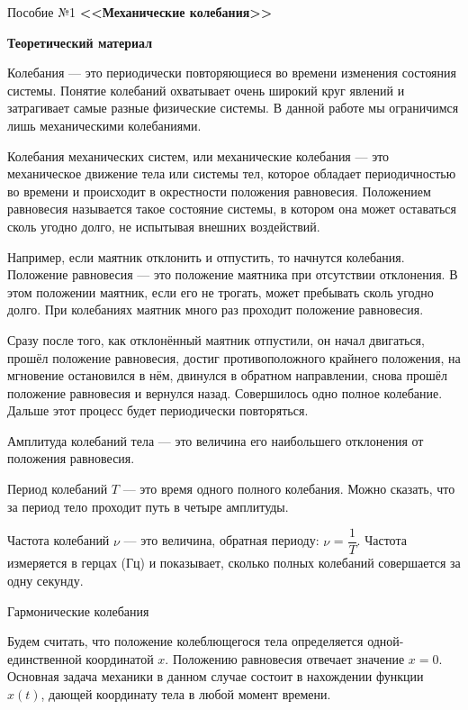 \documentclass[a4paper,12pt]{article} %
\date{}
\author{}
\begin{document}
Пособие №1
\hfill
{\bf <<Механические колебания>>}

\begin{center}
\large \bf Теоретический материал
\end{center}

Колебания — это периодически повторяющиеся во времени изменения состояния
системы. Понятие колебаний охватывает очень широкий круг явлений и затрагивает
самые разные физические системы. В данной работе мы ограничимся лишь
механическими колебаниями.

Колебания механических систем, или механические колебания — это механическое
движение тела или системы тел, которое обладает периодичностью во времени и
происходит в окрестности положения равновесия. Положением равновесия называется
такое состояние системы, в котором она может оставаться сколь угодно долго, не
испытывая внешних воздействий.

Например, если маятник отклонить и отпустить, то начнутся колебания.
Положение равновесия — это положение маятника при отсутствии отклонения. В этом
положении маятник, если его не трогать, может пребывать сколь угодно долго. При
колебаниях маятник много раз проходит положение равновесия.

Сразу после того, как отклонённый маятник отпустили, он начал двигаться, прошёл
положение равновесия, достиг противоположного крайнего положения, на мгновение
остановился в нём, двинулся в обратном направлении, снова прошёл положение
равновесия и вернулся назад. Совершилось одно полное колебание. Дальше этот
процесс будет периодически повторяться.

Амплитуда колебаний тела — это величина его наибольшего отклонения от
положения равновесия.

Период колебаний $T$ — это время одного полного колебания. Можно сказать, что за
период тело проходит путь в четыре амплитуды.

Частота колебаний $\nu$ — это величина, обратная периоду: $\nu$ = $\dfrac1T$. Частота
измеряется в герцах (Гц) и показывает, сколько полных колебаний совершается за
одну секунду.

\begin{center}
\large Гармонические колебания
\end{center}

Будем считать, что положение колеблющегося тела определяется одной-единственной
координатой $x$. Положению равновесия отвечает значение $x = 0$. Основная задача
механики в данном случае состоит в нахождении функции $x(t)$, дающей координату
тела в любой момент времени.
\end{document}
